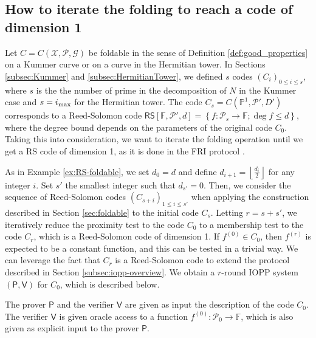 \documentclass[10pt,a4paper]{article}
\newcommand\F{\mathbb{F}}
\newcommand\PP{\mathbb{P}}
\newcommand\floor[1]{\left\lfloor #1 \right\rfloor}
\newcommand\RS[1]{\mathsf{RS}\left[\F,#1\right]}
\newcommand\prover{\mathsf{P}}
\newcommand\verifier{\mathsf{V}}
\newcommand{\set}[1]{\left\{#1\right\}}
\newcommand\calX{\mathcal{X}}
\newcommand\calP{\mathcal{P}}
\newcommand\calG{\mathcal{G}}
\newcommand{\ii}{i_{\rm{max}}}
\theoremstyle{plain}
\theoremstyle{plain}
\theoremstyle{definition}
\theoremstyle{remark}
\theoremstyle{plain}
\begin{document}
\subsection{How to iterate the folding to reach a code of dimension 1}\label{subsec:fast-iopp}
Let $C=C(\calX,\calP,\calG)$ be foldable in the sense of Definition \ref{def:good_properties} on a Kummer curve or on a curve in the Hermitian tower. In Sections \ref{subsec:Kummer} and \ref{subsec:HermitianTower}, we defined $s$ codes $(C_i)_{0\le i\le s}$, where $s$ is the the number of prime in the decomposition of $N$ in the Kummer case and $s=\ii$ for the Hermitian tower. The code $C_s = C(\PP^1, \calP', D')$ corresponds to a Reed-Solomon code $\RS{\calP', d} = \set{f : \calP_s \rightarrow \F; \deg f \le d}$, where the degree bound depends on the parameters of the original code $C_0$. Taking this into consideration, we want to iterate the folding operation until we get a RS code of dimension 1, as it is done in the \textsf{FRI} protocol \cite{BBHR18a}. 

As in Example \ref{ex:RS-foldable}, we set $d_0 = d$ and define $d_{i+1} = \floor{\frac{d_i}{2}}$ for any integer $i$. Set $s'$ the smallest integer such that $d_{s'} = 0$. Then, we consider the sequence of Reed-Solomon codes $(C_{s + i})_{1 \le i \le s'}$ when applying the construction described in Section \ref{sec:foldable} to the initial code $C_s$. Letting $r = s + s'$, we iteratively reduce the proximity test to the code $C_0$ to a membership test to the code $C_{r}$, which is a Reed-Solomon code of dimension 1. If $f^{(0)} \in C_0$, then $f^{(r)}$ is expected to be a constant function, and this can be tested in a trivial way. We can leverage the fact that $C_r$ is a Reed-Solomon code to extend the protocol described in Section \ref{subsec:iopp-overview}. We obtain a $r$-round IOPP system $(\prover, \verifier)$ for $C_0$, which is described below.

The prover $\prover$ and the verifier $\verifier$ are given as input the description of the code $C_0$.      
The verifier $\verifier$ is given oracle access to a function $f^{(0)} : \calP_0 \rightarrow \F$, which is also given as explicit input to the prover $\prover$.      
\end{document}
